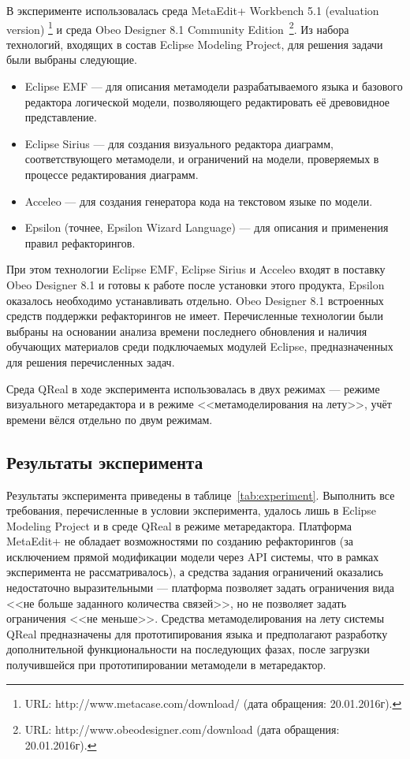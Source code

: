 В эксперименте использовалась среда MetaEdit+ Workbench 5.1 (evaluation version)
\footnote{URL: http://www.metacase.com/download/ (дата обращения: 20.01.2016г).}
и среда Obeo Designer 8.1 Community Edition~\footnote{URL: http://www.obeodesigner.com/download (дата обращения: 20.01.2016г).}.
Из набора технологий, входящих в состав Eclipse Modeling Project, для решения задачи были выбраны
следующие.
\begin{itemize}
	\item Eclipse EMF --- для описания метамодели разрабатываемого языка и базового редактора
		логической модели, позволяющего редактировать её древовидное представление.
	\item Eclipse Sirius --- для создания визуального редактора диаграмм, соответствующего
		метамодели, и ограничений на модели, проверяемых в процессе редактирования диаграмм.
	\item Acceleo --- для создания генератора кода на текстовом языке по модели.
	\item Epsilon (точнее, Epsilon Wizard Language) --- для описания и применения правил рефакторингов.
\end{itemize}

При этом технологии Eclipse EMF, Eclipse Sirius и Acceleo входят в поставку Obeo Designer 8.1
и готовы к работе после установки этого продукта, Epsilon оказалось необходимо устанавливать
отдельно. Obeo Designer 8.1 встроенных средств поддержки рефакторингов не имеет.
Перечисленные технологии были выбраны на основании анализа времени последнего обновления
и наличия обучающих материалов среди подключаемых модулей Eclipse, предназначенных для решения
перечисленных задач.

Среда QReal в ходе эксперимента использовалась в двух режимах --- режиме визуального метаредактора
и в режиме <<метамоделирования на лету>>, учёт времени вёлся отдельно по двум режимам.

\subsection{Результаты эксперимента}
Результаты эксперимента приведены в таблице~\ref{tab:experiment}. Выполнить все требования,
перечисленные в условии эксперимента, удалось лишь в Eclipse Modeling Project и в
среде QReal в режиме метаредактора. Платформа MetaEdit+ не обладает возможностями по созданию
рефакторингов (за исключением прямой модификации модели через \ac{API} системы,
что в рамках эксперимента не рассматривалось), а средства задания ограничений оказались
недостаточно выразительными --- платформа позволяет задать ограничения вида <<не больше
заданного количества связей>>, но не позволяет задать ограничения <<не меньше>>.
Средства метамоделирования на лету системы QReal предназначены для прототипирования
языка и предполагают разработку дополнительной функциональности на последующих фазах,
после загрузки получившейся при прототипировании метамодели в метаредактор. 

